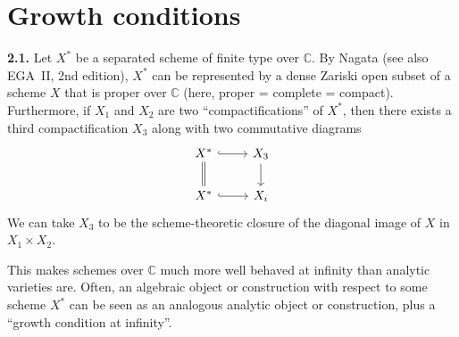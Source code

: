 \documentclass{report}
\newenvironment{itenv}[1]
  {\phantomsection\par\medskip\noindent\textbf{#1.}\itshape}
  {\par\medskip}
\newenvironment{rmenv}[1]
  {\phantomsection\par\medskip\noindent\textbf{#1.}\rmfamily}
  {\par\medskip}
\newcommand{\CC}{\mathbb{C}}
\newcommand{\oldpage}[1]{\marginpar{\footnotesize$\Big\vert$ \textit{p.~#1}}}
\begin{document}




\section{Growth conditions}
\label{II.2}

\begin{rmenv}{2.1}
\label{II.2.1}
  Let $X^*$ be a separated scheme of finite type over $\CC$.
  By Nagata \cite{20} (see also EGA~II, 2nd edition), $X^*$ can be represented by a dense Zariski open subset of a scheme $X$ that is proper over $\CC$ (here, proper = complete = compact).
  Furthermore, if $X_1$ and $X_2$ are two ``compactifications'' of $X^*$, then there exists a third compactification $X_3$ along with two commutative diagrams
  \[
    \begin{tikzcd}
      X^* \rar[hook] \dar[equal]
      & X_3 \dar
    \\ X^* \rar[hook]
      & X_i
    \end{tikzcd}
  \]
  We can take $X_3$ to be the scheme-theoretic closure of the diagonal image of $X$ in $X_1\times X_2$.

  This makes schemes over $\CC$ much more well behaved at infinity than analytic varieties are.
  Often, an algebraic object or construction with respect to some scheme $X^*$ can be seen as an analogous analytic object or construction, plus a ``growth condition at infinity''.
\end{rmenv}
\end{document}
